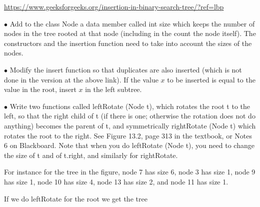 \documentclass[11pt]{article}
\begin{document}

\url{https://www.geeksforgeeks.org/insertion-in-binary-search-tree/?ref=lbp}
\medskip

$\bullet$ Add to the class \textsf{Node}  a data member called \textsf{int size} which keeps the number of nodes in the tree rooted at that node (including in the count the node itself). The constructors and the insertion function need to take into account the sizes of the nodes.
\medskip

$\bullet$ Modify the \textsf{insert} function so that duplicates are also inserted (which is not done in the version at the above link). If the value $x$  to be inserted is equal to the value in the root, insert $x$ in the left subtree.
\medskip





$\bullet$  Write two functions called \textsf{leftRotate (Node t)}, which rotates the root t to the left, so that the right child of t (if there is one; otherwise the rotation does not do anything) becomes the parent of t, and symmetrically  \textsf{rightRotate (Node t) which rotates the root to the right}. See Figure 13.2, page 313 in the textbook, or Notes 6 on Blackboard. Note that when you do \textsf{leftRotate (Node t)}, you need to change the size of \textsf{t} and of \textsf{t.right}, and similarly for \textsf{rightRotate}.



For instance for the tree in the figure,  node 7 has size 6, node 3 has size 1, node 9 has size 1, node 10 has size 4, node 13 has size 2, and node 11 has size 1.

If we do \textsf{leftRotate} for the root we get the tree

\end{document}

